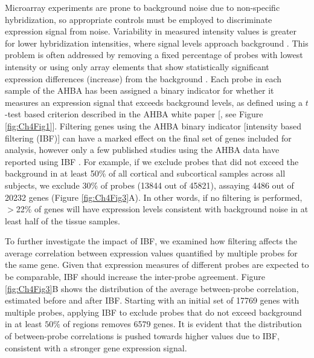 Microarray experiments are prone to background noise due to non-specific hybridization, so appropriate controls must be employed to discriminate expression signal from noise. Variability in measured intensity values is greater for lower hybridization intensities, where signal levels approach background \citep{Quackenbush2002a}. This problem is often addressed by removing a fixed percentage of probes with lowest intensity or using only array elements that show statistically significant expression differences (increase) from the background \citep{Quackenbush2002a}. Each probe in each sample of the AHBA has been assigned a binary indicator for whether it measures an expression signal that exceeds background levels, as defined using a $t$-test based criterion described in the AHBA white paper [\citep{AHBAdoc}, see Figure \ref{fig:Ch4Fig1}]. Filtering genes using the AHBA binary indicator [intensity based filtering (IBF)] can have a marked effect on the final set of genes included for analysis, however only a few published studies using the AHBA data have reported using IBF \citep{Hawrylycz2012,Richiardi2015,Burt2018}. For example, if we exclude probes that did not exceed the background in at least 50\% of all cortical and subcortical samples across all subjects, we exclude 30\% of probes (\num{13844} out of \num{45821}), assaying \num{4486} out of \num{20232} genes (Figure \ref{fig:Ch4Fig3}A). In other words, if no filtering is performed, $>$22\% of genes will have expression levels consistent with background noise in at least half of the tissue samples.

To further investigate the impact of IBF, we examined how filtering affects the average correlation between expression values quantified by multiple probes for the same gene. Given that expression measures of different probes are expected to be comparable, IBF should increase the inter-probe agreement. Figure \ref{fig:Ch4Fig3}B shows the distribution of the average between-probe correlation, estimated before and after IBF. Starting with an initial set of \num{17769} genes with multiple probes, applying IBF to exclude probes that do not exceed background in at least $50\%$ of regions removes \num{6579} genes. It is evident that the distribution of between-probe correlations is pushed towards higher values due to IBF, consistent with a stronger gene expression signal.

